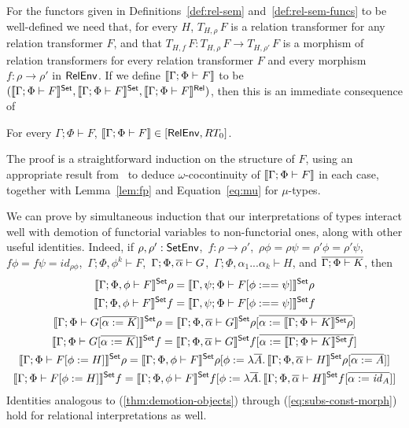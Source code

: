 \documentclass{lmcs}
\theoremstyle{plain}\newtheorem{satz}[thm]{Satz}
\renewcommand{\id}{\mathit{id}}
\begin{document}
{For the functors given in Definitions~\ref{def:rel-sem}
and~\ref{def:rel-sem-funcs} to be well-defined we need that, for every
$H$, $T_{H,\rho}\,F$ is a relation transformer for any relation
transformer $F$, and that $T_{H,f}\, F : T_{H,\rho}\, F \to
T_{H,\rho'}\, F$ is a morphism of relation transformers for every
relation transformer $F$ and every morphism $f : \rho \to \rho'$ in
$\mathsf{RelEnv}$. If we define $\llbracket{\Gamma;\Phi \vdash F}\rrbracket$ to be
$(\llbracket{\Gamma;\Phi \vdash F}\rrbracket^{\mathsf{Set}}, \llbracket{\Gamma;\Phi \vdash
  F}\rrbracket^{\mathsf{Set}},\llbracket{\Gamma;\Phi \vdash F}\rrbracket^{\mathsf{Rel}})$, then this is an immediate
consequence of
\begin{lem}\label{lem:rel-transf-morph}
For every $\Gamma;\Phi \vdash F$, $\llbracket{\Gamma;\Phi \vdash F}\rrbracket
\in[\mathsf{RelEnv},RT_0]$.
\end{lem}
\noindent
The proof is a straightforward induction on the structure of $F$,
using an appropriate result from~\cite{jp19} to deduce
$\omega$-cocontinuity of $\llbracket{\Gamma;\Phi \vdash F}\rrbracket$ in each case,
together with Lemma~\ref{lem:fp} and Equation~\ref{eq:mu} for
$\mu$-types.

We can prove by simultaneous induction that our interpretations of
types interact well with demotion of functorial variables to
non-functorial ones, along with other useful identities. Indeed, if
$\rho, \rho' : \mathsf{SetEnv}$, \,$f : \rho \to \rho'$, \,$\rho \phi = \rho
\psi = \rho' \phi = \rho' \psi$, \, $f \phi = f \psi = \id_{\rho
  \phi}$,\, $\Gamma; \Phi, \phi^k \vdash F$,\,
$\Gamma;\Phi,\overline{\alpha} \vdash G$,\, $\Gamma;\Phi,\alpha_1...\alpha_k
\vdash H$, and $\overline{\Gamma;\Phi \vdash K}$, then
\begin{gather}
\label{thm:demotion-objects}
\setsem{\Gamma; \Phi, \phi \vdash F} \rho = \setsem{\Gamma, \psi; \Phi
  \vdash F[\phi :== \psi] } \rho\\
\label{thm:demotion-morphisms}
\setsem{\Gamma; \Phi, \phi \vdash F} f = \setsem{\Gamma, \psi; \Phi
  \vdash F[\phi :== \psi]} f\\
\label{eq:subs-var}
\setsem{\Gamma;\Phi \vdash G[\ol{\alpha := K}]}\rho =
\setsem{\Gamma;\Phi,\ol{\alpha} \vdash G}\rho[\ol{\alpha := 
\setsem{\Gamma;\Phi \vdash K}\rho}]\\
\label{eq:subs-var-morph}
\setsem{\Gamma;\Phi \vdash G[\ol{\alpha := K}]}f =
\setsem{\Gamma;\Phi,\ol{\alpha} \vdash G}f[\ol{\alpha :=
\setsem{\Gamma;\Phi \vdash K}f}]\\
\label{eq:subs-const}
\setsem{\Gamma; \Phi \vdash F[\phi := H]}\rho
= \setsem{\Gamma; \Phi, \phi \vdash F}\rho
[\phi := \lambda \ol{A}.\, \setsem{\Gamma;\Phi,\overline{\alpha}\vdash
    H}\rho[\overline{\alpha := A}]] \\ 
\label{eq:subs-const-morph}
\setsem{\Gamma; \Phi \vdash F[\phi := H]}f
= \setsem{\Gamma; \Phi, \phi \vdash F}f
[\phi := \lambda \ol{A}.\,\setsem{\Gamma;\Phi,\overline{\alpha}\vdash
    H}f[\overline{\alpha := \id_A}]] 
\end{gather}
Identities analogous to (\ref{thm:demotion-objects}) through
(\ref{eq:subs-const-morph}) hold for relational interpretations as well.

}
\end{document}
